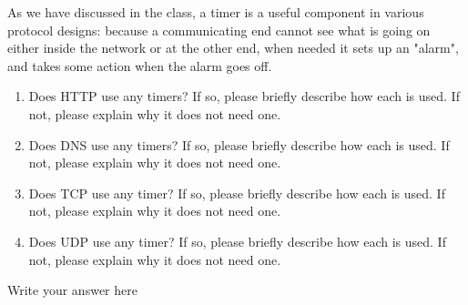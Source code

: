 \documentclass{report}
\begin{document}
\newpage



\begin{problem}

As we have discussed in the class, a timer is a useful component in various protocol designs: because a communicating end cannot see what is going on either inside the network or at the other end, when needed it sets up an "alarm", and takes some action when the alarm goes off.

\begin{enumerate}
    \item Does HTTP use any timers? If so, please briefly describe how each is used. If not, please explain why it does not need one.
    \item Does DNS use any timers? If so, please briefly describe how each is used. If not, please explain why it does not need one.
    \item Does TCP use any timer?  If so, please briefly describe how each is used. If not, please explain why it does not need one.
    \item Does UDP use any timer?   If so, please briefly describe how each is used. If not, please explain why it does not need one.
\end{enumerate}

\begin{answer}{40em}
    Write your answer here
\end{answer}

\end{problem}
\end{document}
